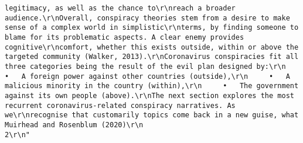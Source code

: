 \documentclass[
]{book}
\begin{document}
\begin{verbatim}
legitimacy, as well as the chance to\r\nreach a broader audience.\r\nOverall, conspiracy theories stem from a desire to make sense of a complex world in simplistic\r\nterms, by finding someone to blame for its problematic aspects. A clear enemy provides cognitive\r\ncomfort, whether this exists outside, within or above the targeted community (Walker, 2013).\r\nCoronavirus conspiracies fit all three categories being the result of the evil plan designed by:\r\n     •   A foreign power against other countries (outside),\r\n     •   A malicious minority in the country (within),\r\n     •   The government against its own people (above).\r\nThe next section explores the most recurrent coronavirus-related conspiracy narratives. As we\r\nrecognise that customarily topics come back in a new guise, what Muirhead and Rosenblum (2020)\r\n                                                                                                         2\r\n"

\end{verbatim}
\end{document}
